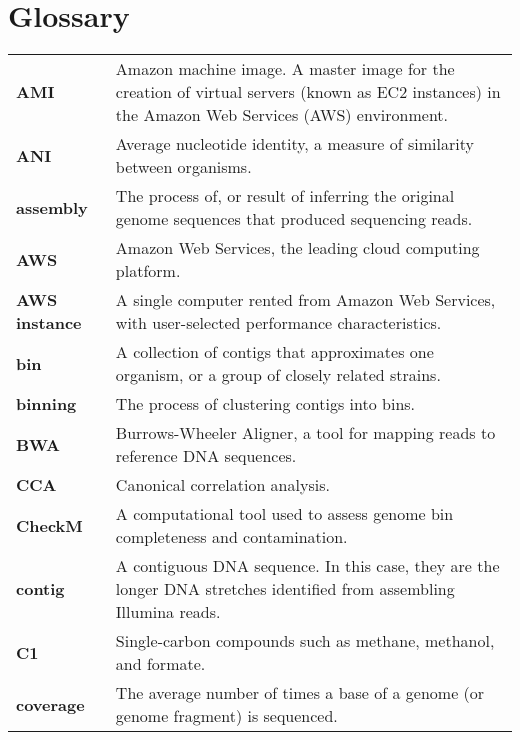 \chapter*{Glossary} %
\renewcommand*{\arraystretch}{1.4} %

\begin{singlespace}
\begin{longtable}{ p{}  p{} }

\textbf{AMI} & Amazon machine image.  A master image for the creation of virtual servers (known as EC2 instances)
                in the Amazon Web Services (AWS) environment. \\
\textbf{ANI} & Average nucleotide identity, a measure of similarity between organisms. \\
\textbf{assembly} &  The process of, or result of inferring the original genome sequences that produced sequencing reads. \\
\textbf{AWS} & Amazon Web Services, the leading cloud computing platform. \\
\textbf{AWS instance} & A single computer rented from Amazon Web Services, with user-selected performance characteristics. \\
\textbf{bin} & A collection of contigs that approximates one organism, or a group of closely related strains. \\
\textbf{binning} &  The process of clustering contigs into bins.  \\ %
\textbf{BWA} & Burrows-Wheeler Aligner, a tool for mapping reads to reference DNA sequences. \\
\textbf{CCA} & Canonical correlation analysis. \\
\textbf{CheckM} &  A computational tool used to assess genome bin completeness and contamination. \\
\textbf{contig} & A contiguous DNA sequence.  In this case, they are the longer DNA stretches identified from assembling Illumina reads. \\
\textbf{C1} & Single-carbon compounds such as methane, methanol, and formate. \\
\textbf{coverage} & The average number of times a base of a genome (or genome fragment) is sequenced.  \\

\end{longtable}
\end{singlespace}
